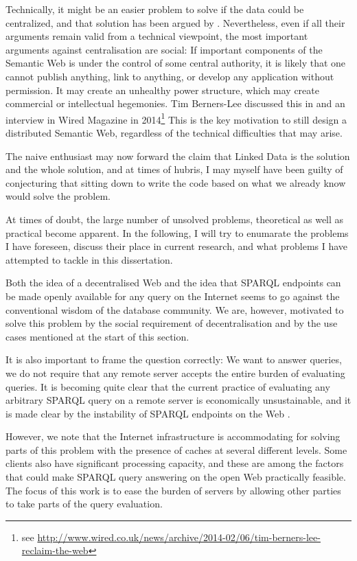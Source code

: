 Technically, it might be an easier problem to solve if the data could
be centralized, and that solution has been argued by
\cite{DBLP:conf/semweb/BetzGHS12}. Nevertheless, even if all their
arguments remain valid from a technical viewpoint, the most important
arguments against centralisation are social: If important components
of the Semantic Web is under the control of some central authority, it
is likely that one cannot publish anything, link to anything, or
develop any application without permission. It may create an unhealthy
power structure, which may create commercial or intellectual
hegemonies. Tim Berners-Lee discussed this in \cite{berners2000weaving} and an
interview in Wired Magazine in 2014\footnote{see
  \url{http://www.wired.co.uk/news/archive/2014-02/06/tim-berners-lee-reclaim-the-web}}
This is the key motivation to still design a distributed Semantic Web,
regardless of the technical difficulties that may arise.

The naive enthusiast may now forward the claim that Linked Data is the
solution and the whole solution, and at times of hubris, I may myself
have been guilty of conjecturing that sitting down to write the code
based on what we already know would solve the problem.

At times of doubt, the large number of unsolved problems, theoretical
as well as practical become apparent. In the following, I will try to
enumarate the problems I have foreseen, discuss their place in current
research, and what problems I have attempted to tackle in this
dissertation.

Both the idea of a decentralised Web and the idea that SPARQL
endpoints can be made openly available for any query on the Internet
seems to go against the conventional wisdom of the database
community. We are, however, motivated to solve this problem by the
social requirement of decentralisation and by the use cases mentioned
at the start of this section.

It is also important to frame the question correctly: We want to
answer queries, we do not require that any remote server accepts the
entire burden of evaluating queries. It is becoming quite clear that
the current practice of evaluating any arbitrary SPARQL query on a
remote server is economically unsustainable, and it is made clear by
the instability of SPARQL endpoints on the Web \cite{buil2013sparql}.

However, we note that the Internet infrastructure is accommodating for
solving parts of this problem with the presence of caches at several
different levels. Some clients also have significant processing
capacity, and these are among the factors that could make SPARQL query
answering on the open Web practically feasible. The focus of this work
is to ease the burden of servers by allowing other parties to take
parts of the query evaluation.



